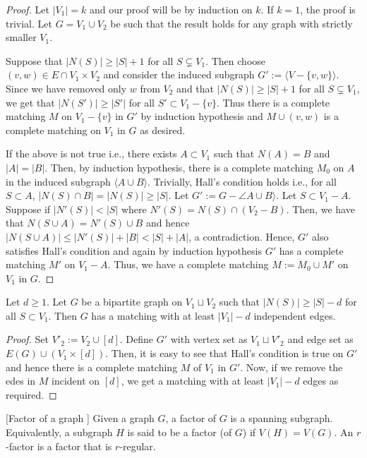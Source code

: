 \documentclass[../basic_graph_theory.tex]{subfiles}
\begin{document}
\begin{proof}
    Let $|V_1| = k$ and our proof will be by induction on $k$. If $k = 1$, the proof is trivial. Let $G = V_1 \cup V_2$ be such that the result holds for any graph with strictly smaller $V_1$.
    
    Suppose that $|N(S)| \geq |S| + 1$ for all $S \subsetneq V_1$. Then choose $(v,w) \in E \cap V_1 \times V_2$ and consider the induced subgraph $G' := \langle V - \{v,w\} \rangle$. Since we have removed only $w$ from $V_2$ and that $|N(S)| \geq |S| + 1$ for all $S \subsetneq V_1$, we get that $|N(S')| \geq |S'|$ for all $S' \subset V_1 - \{v\}$. Thus there is a complete matching $M$ on $V_1 - \{v\}$ in $G'$ by induction hypothesis and $M \cup (v,w)$ is a complete matching on $V_1$ in $G$ as desired.

    If the above is not true i.e., there exists $A \subset V_1$ such that $N(A) = B$ and $|A| = |B|$. Then, by induction hypothesis, there is a complete matching $M_0$ on $A$ in the induced subgraph $\langle A \cup B \rangle$. Trivially,  Hall's condition holds i.e., for all $S \subset A$,  $|N(S) \cap B| =  |N(S)| \geq |S|$. Let $G' := G - \angle  A \cup B \rangle$.  Let $S \subset V_1 - A$.  Suppose if $|N'(S)| < |S|$ where $N'(S) = N(S) \cap (V_2 - B)$.  Then,  we have that $N(S \cup A) = N'(S) \cup B$ and hence $|N(S \cup A)| \leq |N'(S)| + |B| < |S| + |A|$,  a contradiction.  Hence, $G'$ also satisfies Hall's condition and again by induction hypothesis $G'$ has a complete matching $M'$ on $V_1 -A$. Thus, we have a complete matching $M := M_0 \cup M'$ on $V_1$ in $G$.
\end{proof}

\begin{prop}
    Let $d \geq 1$. Let $G$ be a bipartite graph on $V_1 \sqcup V_2$ such that $|N(S)| \geq |S| - d$ for all $S \subset V_1$. Then $G$ has a matching with at least $|V_1| - d$ independent edges.
\end{prop}

\begin{proof}
    Set $V'_2 := V_2 \cup [d]$. Define $G'$ with vertex set as $V_1 \sqcup V'_2$ and edge set as $E(G) \cup (V_1 \times [d])$. Then, it is easy to see that Hall's condition is true on $G'$ and hence there is a complete matching $M$ of $V_1$ in $G'$. Now, if we remove the edes in $M$ incident on $[d]$, we get a matching with at least $|V_1| - d$ edges as required.
\end{proof}

\begin{Def}{}{}[Factor of a graph ]
    Given a graph $G$,  a factor of $G$ is a spanning subgraph.  Equivalently,  a subgraph $H$ is said to be a factor (of $G$) if $V(H) = V(G)$. An $r$-factor is a factor that is $r$-regular.
\end{Def}
\end{document}
